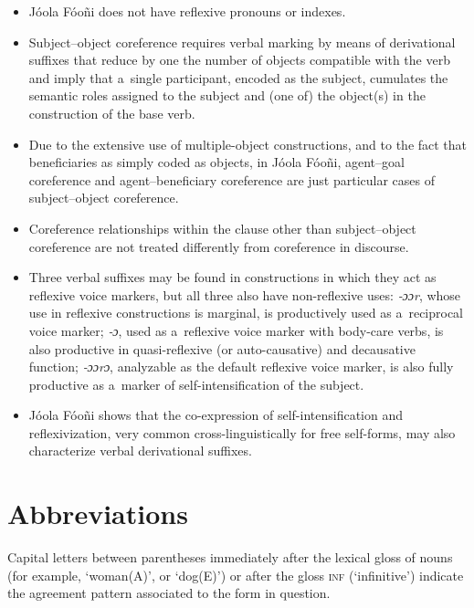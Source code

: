 \documentclass[output=paper]{langscibook}
\begin{document}
\begin{itemize}
\item Jóola Fóoñi does not have reflexive pronouns or indexes.
\item Subject--object coreference requires verbal marking by means of
  derivational suffixes that reduce by one the number of objects compatible
  with the verb and imply that a~single participant, encoded as the subject,
  cumulates the semantic roles assigned to the subject and (one of) the
  object(s) in the construction of the base verb.
\item Due to the extensive use of multiple-object constructions, and to the
  fact that beneficiaries as simply coded as objects, in Jóola Fóoñi,
  agent--goal coreference and agent--beneficiary coreference are just
  particular cases of subject--object coreference.
\item Coreference relationships within the clause other than subject--object
  coreference are not treated differently from coreference in discourse.
\item Three verbal suffixes may be found in constructions in which they act as
  reflexive voice markers, but all three also have non-reflexive uses:
  \textit{‑ɔɔr}, whose use in reflexive constructions is marginal, is
  productively used as a~reciprocal voice marker; \textit{‑ɔ}, used as
  a~reflexive voice marker with body-care verbs, is also productive in
  quasi-reflexive (or auto-causative) and decausative function; \textit{‑ɔɔrɔ},
  analyzable as the default reflexive voice marker, is also fully productive as
  a~marker of self-intensification of the subject.
\item Jóola Fóoñi shows that the co-expression of self-intensification and
  reflexivization, very common cross-linguistically for free self-forms, may
  also characterize verbal derivational suffixes.
\end{itemize}




\section*{Abbreviations}

Capital letters between parentheses immediately after the lexical gloss of
nouns (for example, `woman(A)', or `dog(E)') or after the gloss \textsc{inf}
(`infinitive') indicate the agreement pattern associated to the form in
question.
\end{document}
